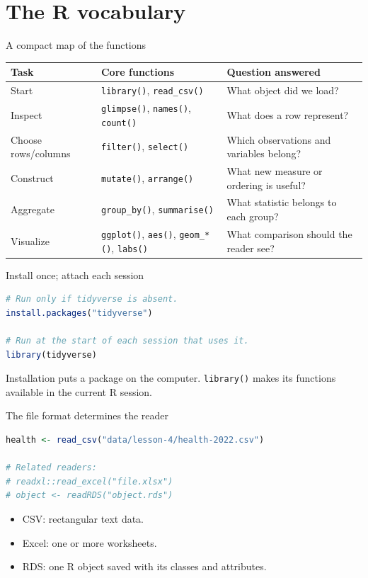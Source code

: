 \section{The R vocabulary}

\begin{frame}{A compact map of the functions}
\small
\begin{tabularx}{\textwidth}{p{2.3cm} X X}
\toprule
Task & Core functions & Question answered \\
\midrule
Start & \texttt{library()}, \texttt{read\_csv()} & What object did we load? \\
Inspect & \texttt{glimpse()}, \texttt{names()}, \texttt{count()} & What does a row represent? \\
Choose rows/columns & \texttt{filter()}, \texttt{select()} & Which observations and variables belong? \\
Construct & \texttt{mutate()}, \texttt{arrange()} & What new measure or ordering is useful? \\
Aggregate & \texttt{group\_by()}, \texttt{summarise()} & What statistic belongs to each group? \\
Visualize & \texttt{ggplot()}, \texttt{aes()}, \texttt{geom\_*()}, \texttt{labs()} & What comparison should the reader see? \\
\bottomrule
\end{tabularx}
\end{frame}

\begin{frame}[fragile]{Install once; attach each session}
\begin{lstlisting}[language=R]
# Run only if tidyverse is absent.
install.packages("tidyverse")

# Run at the start of each session that uses it.
library(tidyverse)
\end{lstlisting}
\vspace{0.35cm}
Installation puts a package on the computer. \texttt{library()} makes its functions available in the current R session.
\end{frame}

\begin{frame}[fragile]{The file format determines the reader}
\begin{lstlisting}[language=R]
health <- read_csv("data/lesson-4/health-2022.csv")

# Related readers:
# readxl::read_excel("file.xlsx")
# object <- readRDS("object.rds")
\end{lstlisting}
\begin{itemize}
\item CSV: rectangular text data.
\item Excel: one or more worksheets.
\item RDS: one R object saved with its classes and attributes.
\end{itemize}
\end{frame}

